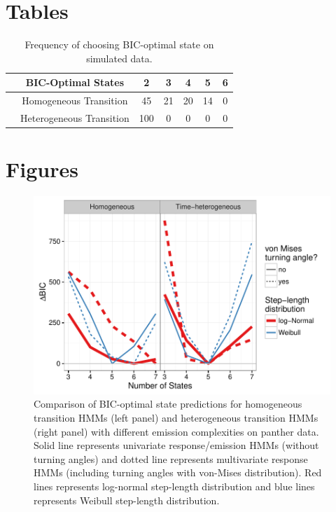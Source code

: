 \documentclass{bmcart}
\begin{document}

\section*{Tables}

\begin{table}[h!]
\caption{Frequency of choosing BIC-optimal state on simulated data.}
\begin{tabular}{ccccccc}
  & BIC-Optimal States       & \bf{2}  & \bf{3}  & \bf{4} & \bf{5} & \bf{6} \\ \hline
  & Homogeneous Transition   & 45 & 21 & 20 & 14 & 0 \\ \hline
  & Heterogeneous Transition & 100 & 0 & 0 & 0 & 0 \\ \hline
\end{tabular}
\end{table}

\clearpage

\section*{Figures}
  \begin{figure}[h!]
   \includegraphics[width=5in]{figure/Figure-1}
  \caption{Comparison of BIC-optimal state predictions for homogeneous transition HMMs (left panel) and heterogeneous transition HMMs (right panel) with different emission complexities on panther data. Solid line represents univariate response/emission HMMs (without turning angles) and dotted line represents multivariate response HMMs (including turning angles with von-Mises distribution). Red lines represents log-normal step-length distribution and blue lines represents Weibull step-length distribution. }
      \end{figure}
      
\end{document}
